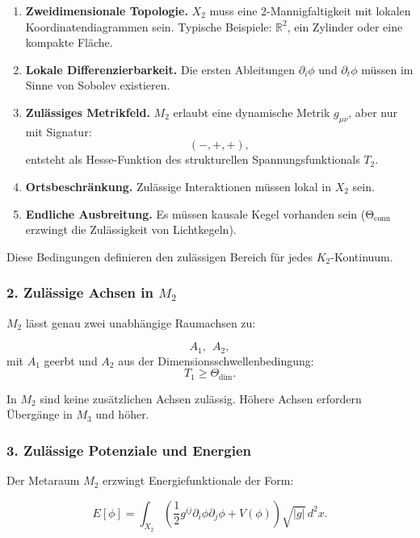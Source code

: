 \begin{enumerate}
    \item \textbf{Zweidimensionale Topologie.}
    $X_2$ muss eine 2-Mannigfaltigkeit mit lokalen Koordinatendiagrammen sein.
    Typische Beispiele: $\mathbb{R}^2$, ein Zylinder oder eine kompakte Fläche.

    \item \textbf{Lokale Differenzierbarkeit.}
    Die ersten Ableitungen $\partial_i\phi$ und $\partial_t\phi$ müssen im Sinne von Sobolev existieren.

    \item \textbf{Zulässiges Metrikfeld.}
    $M_2$ erlaubt eine dynamische Metrik $g_{\mu\nu}$, aber nur mit Signatur:
    \[
    (-,+,+),
    \]
    entsteht als Hesse-Funktion des strukturellen Spannungsfunktionals $T_2$.

    \item \textbf{Ortsbeschränkung.}
    Zulässige Interaktionen müssen lokal in $X_2$ sein.

    \item \textbf{Endliche Ausbreitung.}
    Es müssen kausale Kegel vorhanden sein (Θ\(_{\text{conn}}\) erzwingt die Zulässigkeit von Lichtkegeln).
\end{enumerate}

Diese Bedingungen definieren den zulässigen Bereich für jedes $K_2$-Kontinuum.

\subsubsection*{2. Zulässige Achsen in \texorpdfstring{$M_2$}{M_2}}

$M_2$ lässt genau zwei unabhängige Raumachsen zu:

\[
A_1,\ \ A_2,
\]
mit $A_1$ geerbt und $A_2$ aus der Dimensionsschwellenbedingung:
\[
T_1 \ge \Theta_{\text{dim}}.
\]

In $M_2$ sind keine zusätzlichen Achsen zulässig.
Höhere Achsen erfordern Übergänge in $M_3$ und höher.

\subsubsection*{3. Zulässige Potenziale und Energien}

Der Metaraum $M_2$ erzwingt Energiefunktionale der Form:

\[
E[\phi]
=
\int_{X_2}
\left(
\frac{1}{2} g^{ij} \partial_i \phi \partial_j \phi
+ V(\phi)
\right) \sqrt{|g|}\, d^2x.
\]

